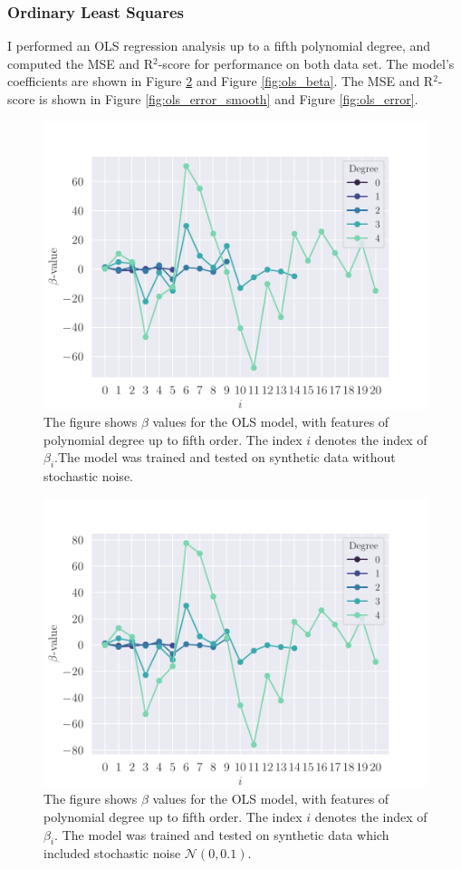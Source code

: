 \subsubsection{Ordinary Least Squares}\label{sssec:ols}
I performed an OLS regression analysis up to a fifth polynomial degree, and computed the MSE and R$^{2}$-score for performance on both data set. The model's coefficients are shown in Figure \ref{fig:ols_beta_smooth} and Figure \ref{fig:ols_beta}. The MSE and R$^{2}$-score is shown in Figure \ref{fig:ols_error_smooth} and Figure \ref{fig:ols_error}.
\begin{figure}
    \centering
    \includegraphics[width=0.9\linewidth]{project-1/latex/figures/ols_beta_smooth_N50.pdf}
    \caption{The figure shows $\beta$ values for the OLS model, with features of polynomial degree up to fifth order. The index $i$ denotes the index of $\beta_{i}$.The model was trained and tested on synthetic data without stochastic noise.}
    \label{fig:ols_beta_smooth}
\end{figure}
\begin{figure}
    \centering
    \includegraphics[width=0.9\linewidth]{project-1/latex/figures/ols_beta_N50.pdf}
    \caption{The figure shows $\beta$ values for the OLS model, with features of polynomial degree up to fifth order. The index $i$ denotes the index of $\beta_{i}$. The model was trained and tested on synthetic data which included stochastic noise $\mathcal{N}(0, 0.1)$.}
    \label{fig:ols_beta_smooth}
\end{figure}
